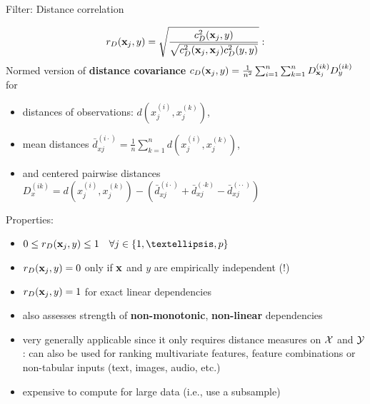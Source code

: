 \begin{vbframe}{Filter: Distance correlation}

$$r_D(\mathbf{x}_j, y) = \sqrt{\frac{c_{D}^2(\mathbf{x}_j, y)}{\sqrt{c_{D}^2(\mathbf{x}_j, \mathbf{x}_j) c_{D}^2(y, y)}}}:$$
Normed version of \textbf{distance covariance} $c_{D}(\mathbf{x}_j, y) = \frac{1}{n^2}\sum^n_{i=1}\sum^n_{k=1} D^{(ik)}_{\mathbf{x}_j} D^{(ik)}_{y}$ for
\begin{itemize}
\item distances of observations: $d\left(x^{(i)}_j, x^{(k)}_j\right)$,
\item mean distances $\bar{d}^{(i\cdot)}_{xj} = \tfrac{1}{n} \sum^n_{k=1} d\left(x^{(i)}_j, x^{(k)}_j\right)$,
\item and centered pairwise distances
$D^{(ik)}_{x} = d\left(x^{(i)}_j, x^{(k)}_j\right) - (\bar{d}^{(i\cdot)}_{xj} + \bar{d}^{(\cdot k)}_{xj} - \bar{d}^{(\cdot \cdot)}_{xj})$
\end{itemize}

\framebreak

Properties:
\begin{itemize}
\item $0 \leq r_D(\xj, y) \leq 1 \quad \forall  j \in \{1, …, p\}$
\item $r_D(\mathbf{x}_j, y) = 0$ only if $\mathbf{x}$ and $y$ are empirically independent (!)
\item $r_D(\mathbf{x}_j, y) = 1$ for exact linear dependencies
\item also assesses strength of \textbf{non-monotonic}, \textbf{non-linear}  dependencies
\item very generally applicable since it only requires distance measures on $\mathcal{X}$ and $\mathcal{Y}$: can also be used for ranking multivariate features, feature combinations or non-tabular inputs (text, images, audio, etc.)
\item expensive to compute for large data (i.e., use a subsample)
\end{itemize}


\end{vbframe}
